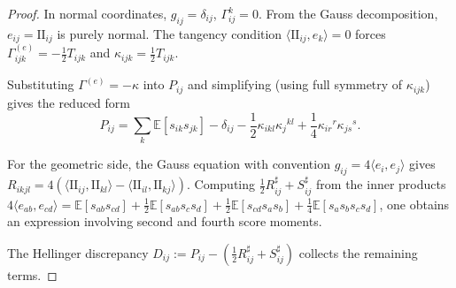 \documentclass[11pt,letterpaper]{amsart}
\newcommand{\E}{\mathbb{E}}
\numberwithin{equation}{section}
\theoremstyle{plain}
\theoremstyle{definition}
\theoremstyle{remark}
\begin{document}
\begin{proof}
In normal coordinates, $g_{ij}=\delta_{ij}$, $\Gamma^k_{ij}=0$. From the Gauss decomposition, $e_{ij}=\mathrm{II}_{ij}$ is purely normal. The tangency condition $\langle \mathrm{II}_{ij},e_k\rangle=0$ forces $\Gamma^{(e)}_{ijk}=-\frac12 T_{ijk}$ and $\kappa_{ijk}=\frac12 T_{ijk}$.

Substituting $\Gamma^{(e)}=-\kappa$ into $P_{ij}$ and simplifying (using full symmetry of $\kappa_{ijk}$) gives the reduced form
\[
P_{ij} = \sum_k\E[s_{ik}s_{jk}]-\delta_{ij} - \frac12\kappa_{ikl}\kappa_j{}^{kl} + \frac14\kappa_{ir}{}^r\kappa_{js}{}^s.
\]

For the geometric side, the Gauss equation with convention $g_{ij}=4\langle e_i,e_j\rangle$ gives
$R_{ikjl}=4(\langle \mathrm{II}_{ij},\mathrm{II}_{kl}\rangle-\langle \mathrm{II}_{il},\mathrm{II}_{kj}\rangle)$.
Computing $\frac12 R^\sharp_{ij}+S^\sharp_{ij}$ from the inner products $4\langle e_{ab},e_{cd}\rangle = \E[s_{ab}s_{cd}]+\frac12\E[s_{ab}s_cs_d]+\frac12\E[s_{cd}s_as_b]+\frac14\E[s_as_bs_cs_d]$, one obtains an expression involving second and fourth score moments.

The Hellinger discrepancy $D_{ij}:=P_{ij}-(\frac12 R^\sharp_{ij}+S^\sharp_{ij})$ collects the remaining terms.
\end{proof}
\end{document}
